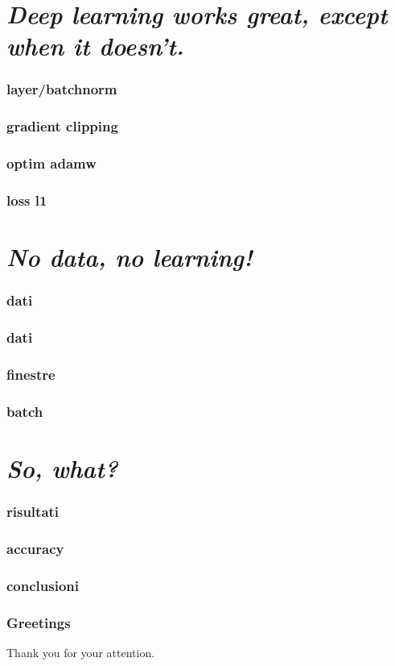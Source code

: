 \documentclass{beamer}
\begin{document}
\section{\textit{Deep learning works great, except when it doesn't.}}{
\begin{frame}
	\frametitle{layer/batchnorm}
\end{frame}
\begin{frame}
	\frametitle{gradient clipping}
\end{frame}
\begin{frame}
	\frametitle{optim adamw}
\end{frame}
\begin{frame}
	\frametitle{loss l1}
\end{frame}
}

\section{\textit{No data, no learning!}}{
\begin{frame}
	\frametitle{dati}
\end{frame}
\begin{frame}
	\frametitle{dati}
\end{frame}
\begin{frame}
	\frametitle{finestre}
\end{frame}
\begin{frame}
	\frametitle{batch}
\end{frame}
}

\section{\textit{So, what?}}{
\begin{frame}
	\frametitle{risultati}
\end{frame}
\begin{frame}
	\frametitle{accuracy}
	\end{frame}
\begin{frame}
	\frametitle{conclusioni}
\end{frame}
}
\begin{frame}
	\frametitle{Greetings}
	Thank you for your attention.
\end{frame}

\end{document}
